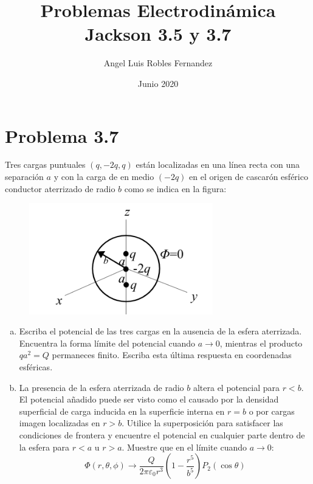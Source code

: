 \documentclass{article}
\title{Problemas Electrodinámica Jackson 3.5 y 3.7}
\author{Angel Luis Robles Fernandez}
\date{Junio 2020}
\begin{document}
\maketitle

\section*{Problema 3.7}

Tres cargas puntuales $(q, -2q, q)$ están localizadas en una línea recta con una separación $a$ y con la carga de en medio $(-2q)$ en el origen de cascarón esférico conductor aterrizado de radio $b$ como se indica en la figura:

\begin{figure}[h]
\includegraphics[width=8cm]{figure1}
\end{figure}

\begin{enumerate}[(a)] 
\item Escriba el potencial de las tres cargas en la ausencia de la esfera aterrizada. Encuentra la forma límite del potencial cuando $a \to 0$, mientras el producto $qa^2 = Q$ permaneces finito. Escriba esta última respuesta en coordenadas esféricas.

\item La presencia de la esfera aterrizada de radio $b$ altera el potencial para $r < b$. El potencial añadido puede ser visto como el causado por la densidad superficial de carga inducida en la superficie interna en $r = b$ o por cargas imagen localizadas en $ r > b$. Utilice la superposición para satisfacer las condiciones de frontera y encuentre el potencial en cualquier parte dentro de la esfera para $ r < a $ u $r > a$. Muestre que en el 
límite cuando $a \to 0$:
\begin{equation}
    \Phi(r,  \theta, \phi) \to \frac{Q}{2\pi \varepsilon_0 r^3} \left(1 - \frac{r^5}{b^5} \right) P_2 (\cos \theta)
\end{equation}
\end{enumerate}
\end{document}
